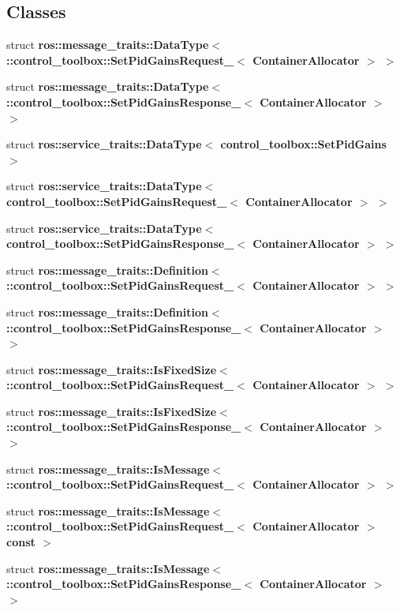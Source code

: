 \subsection*{\-Classes}
\begin{DoxyCompactItemize}
\item 
struct {\bf ros\-::message\-\_\-traits\-::\-Data\-Type$<$ \-::control\-\_\-toolbox\-::\-Set\-Pid\-Gains\-Request\-\_\-$<$ Container\-Allocator $>$ $>$}
\item 
struct {\bf ros\-::message\-\_\-traits\-::\-Data\-Type$<$ \-::control\-\_\-toolbox\-::\-Set\-Pid\-Gains\-Response\-\_\-$<$ Container\-Allocator $>$ $>$}
\item 
struct {\bf ros\-::service\-\_\-traits\-::\-Data\-Type$<$ control\-\_\-toolbox\-::\-Set\-Pid\-Gains $>$}
\item 
struct {\bf ros\-::service\-\_\-traits\-::\-Data\-Type$<$ control\-\_\-toolbox\-::\-Set\-Pid\-Gains\-Request\-\_\-$<$ Container\-Allocator $>$ $>$}
\item 
struct {\bf ros\-::service\-\_\-traits\-::\-Data\-Type$<$ control\-\_\-toolbox\-::\-Set\-Pid\-Gains\-Response\-\_\-$<$ Container\-Allocator $>$ $>$}
\item 
struct {\bf ros\-::message\-\_\-traits\-::\-Definition$<$ \-::control\-\_\-toolbox\-::\-Set\-Pid\-Gains\-Request\-\_\-$<$ Container\-Allocator $>$ $>$}
\item 
struct {\bf ros\-::message\-\_\-traits\-::\-Definition$<$ \-::control\-\_\-toolbox\-::\-Set\-Pid\-Gains\-Response\-\_\-$<$ Container\-Allocator $>$ $>$}
\item 
struct {\bf ros\-::message\-\_\-traits\-::\-Is\-Fixed\-Size$<$ \-::control\-\_\-toolbox\-::\-Set\-Pid\-Gains\-Request\-\_\-$<$ Container\-Allocator $>$ $>$}
\item 
struct {\bf ros\-::message\-\_\-traits\-::\-Is\-Fixed\-Size$<$ \-::control\-\_\-toolbox\-::\-Set\-Pid\-Gains\-Response\-\_\-$<$ Container\-Allocator $>$ $>$}
\item 
struct {\bf ros\-::message\-\_\-traits\-::\-Is\-Message$<$ \-::control\-\_\-toolbox\-::\-Set\-Pid\-Gains\-Request\-\_\-$<$ Container\-Allocator $>$ $>$}
\item 
struct {\bf ros\-::message\-\_\-traits\-::\-Is\-Message$<$ \-::control\-\_\-toolbox\-::\-Set\-Pid\-Gains\-Request\-\_\-$<$ Container\-Allocator $>$const  $>$}
\item 
struct {\bf ros\-::message\-\_\-traits\-::\-Is\-Message$<$ \-::control\-\_\-toolbox\-::\-Set\-Pid\-Gains\-Response\-\_\-$<$ Container\-Allocator $>$ $>$}

\end{DoxyCompactItemize}
